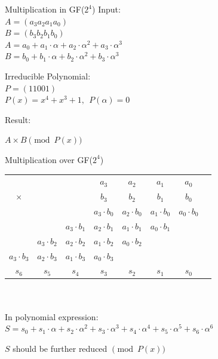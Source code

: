 \documentclass[xcolor=dvipsnames]{beamer}
\begin{document}


\begin{frame}{\large {Multiplication in GF($2^4$)}}
Input: \\
$A=(a_3a_2a_1a_0)$ \\
$B=(b_3b_2b_1b_0)$ \\
$A=a_0+a_1\cdot \alpha+a_2\cdot \alpha^2+a_3\cdot \alpha^3$\\
$B=b_0+b_1\cdot \alpha+b_2\cdot \alpha^2+b_3\cdot \alpha^3$
\bigskip

Irreducible Polynomial: \\
$P=(11001)$ \\
$P(x)=x^4+x^3+1, ~~ P(\alpha) = 0$
\bigskip

Result: 

$A\times B \pmod{ P(x) }$


\end{frame}

\begin{frame}{\large {Multiplication over GF($2^4$)}}

 {\begin{tabular}{c c c c c c c c}
  &   &   & $a_3$ & $a_2$ & $a_1$ & $a_0$  \\ 
 $\times$&   &   & $b_3$ & $b_2$ & $b_1$ & $b_0$  \\ 
 \hline
 &   &   & $a_3\cdot b_0$ & $a_2 \cdot b_0$ & $a_1\cdot b_0$ & $a_0\cdot b_0$ \\
 &  & $a_3\cdot b_1$ & $a_2\cdot b_1$ & $a_1 \cdot b_1$ & $a_0\cdot b_1$ &   \\
 & $a_3\cdot b_2$ & $a_2\cdot b_2$ & $a_1\cdot b_2$ & $a_0\cdot b_2$ &  &   \\
 $a_3\cdot b_3$ & $a_2\cdot b_3$ & $a_1\cdot b_3$ & $a_0\cdot b_3$ &  &  &   \\
 \hline
 $s_6$& $s_5$  & $s_4$  & $s_3$ & $s_2$  & $s_1$   & $s_0$ 
 \end{tabular}\par}

\ \\
\ \\
In polynomial expression:\\
$S=s_0+s_1\cdot \alpha+s_2\cdot \alpha^2+s_3\cdot \alpha^3+s_4\cdot \alpha^4+s_5\cdot \alpha^5+s_6\cdot \alpha^6$

\bigskip

$S$ should be further reduced $\pmod {P(x)}$
\end{frame}
\end{document}
